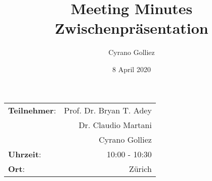 \documentclass[
  paper=a4,                         %
  fontsize=11pt,                    %
  DIV=12,                           %
  BCOR=10mm,                        %
  twoside=true,                     %
  parskip=half,                     %
  headings=small,                   %
 ]{scrartcl}
\title{\huge Meeting Minutes \\ Zwischenpräsentation} %
\author{Cyrano Golliez} %
\date{8 April 2020}
\begin{document}

\maketitle %

\vspace{1.5cm}

\begin{center}
\begin{tabular}{@{} l r @{}} \\   
\toprule
\textbf{Teilnehmer}: \hspace*{7.9cm} & Prof. Dr. Bryan T. Adey 
\vspace{1mm} \\
		   				  			 & Dr. Claudio Martani 
\vspace{1mm} \\
		   				  			 & Cyrano Golliez     
\vspace{1.5cm}  				  					       \\
\textbf{Uhrzeit}: 	                 & 10:00 - 10:30	   \\
\textbf{Ort}:		                 & Zürich				\\
	   				 
\bottomrule			   
\end{tabular} 
\end{center}


\vspace{1cm}

\renewcommand{\contentsname}{Übersicht}
\tableofcontents


\newpage

\setcounter{page}{1}

\end{document}
